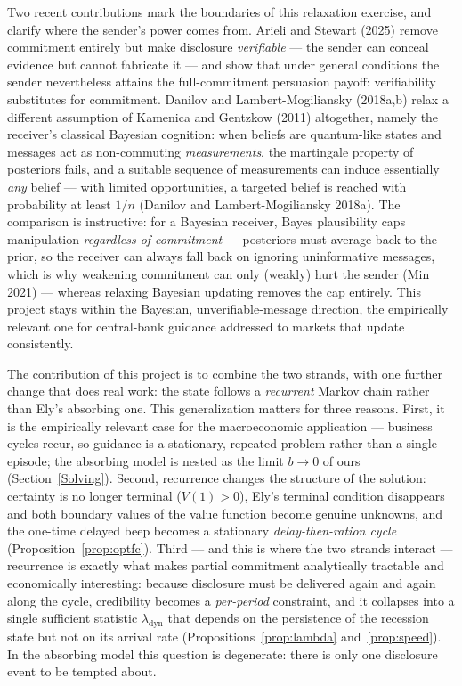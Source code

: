 \documentclass[12pt]{article}
\begin{document}
Two recent contributions mark the boundaries of this relaxation exercise, and clarify where the sender's power comes from. Arieli and Stewart (2025) remove commitment entirely but make disclosure \emph{verifiable} --- the sender can conceal evidence but cannot fabricate it --- and show that under general conditions the sender nevertheless attains the full-commitment persuasion payoff: verifiability substitutes for commitment. Danilov and Lambert-Mogiliansky (2018a,b) relax a different assumption of Kamenica and Gentzkow (2011) altogether, namely the receiver's classical Bayesian cognition: when beliefs are quantum-like states and messages act as non-commuting \emph{measurements}, the martingale property of posteriors fails, and a suitable sequence of measurements can induce essentially \emph{any} belief --- with limited opportunities, a targeted belief is reached with probability at least $1/n$ (Danilov and Lambert-Mogiliansky 2018a). The comparison is instructive: for a Bayesian receiver, Bayes plausibility caps manipulation \emph{regardless of commitment} --- posteriors must average back to the prior, so the receiver can always fall back on ignoring uninformative messages, which is why weakening commitment can only (weakly) hurt the sender (Min 2021) --- whereas relaxing Bayesian updating removes the cap entirely. This project stays within the Bayesian, unverifiable-message direction, the empirically relevant one for central-bank guidance addressed to markets that update consistently.

The contribution of this project is to combine the two strands, with one further change that does real work: the state follows a \emph{recurrent} Markov chain rather than Ely's absorbing one. This generalization matters for three reasons. First, it is the empirically relevant case for the macroeconomic application --- business cycles recur, so guidance is a stationary, repeated problem rather than a single episode; the absorbing model is nested as the limit $b \to 0$ of ours (Section~\ref{Solving}). Second, recurrence changes the structure of the solution: certainty is no longer terminal ($V(1)>0$), Ely's terminal condition disappears and both boundary values of the value function become genuine unknowns, and the one-time delayed beep becomes a stationary \emph{delay-then-ration cycle} (Proposition~\ref{prop:optfc}). Third --- and this is where the two strands interact --- recurrence is exactly what makes partial commitment analytically tractable and economically interesting: because disclosure must be delivered again and again along the cycle, credibility becomes a \emph{per-period} constraint, and it collapses into a single sufficient statistic $\lambda_{\mathrm{dyn}}$ that depends on the persistence of the recession state but not on its arrival rate (Propositions~\ref{prop:lambda} and~\ref{prop:speed}). In the absorbing model this question is degenerate: there is only one disclosure event to be tempted about.
\end{document}
